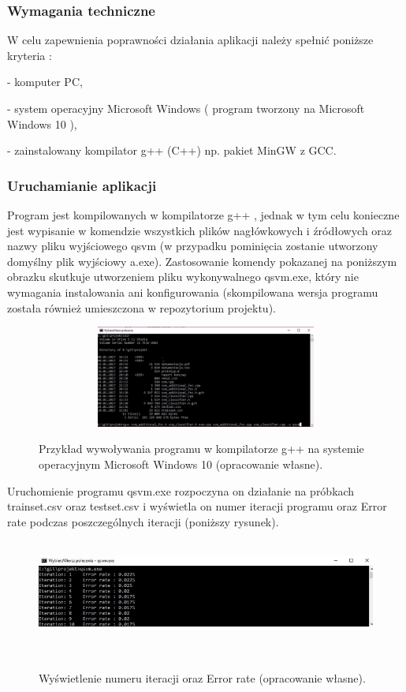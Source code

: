 \documentclass[[10pt,a4paper]{article}
\begin{document}
\begin{enumerate}
\subsubsection{Wymagania techniczne}  

\noindent W celu zapewnienia poprawności działania aplikacji należy spełnić poniższe kryteria :

\noindent - komputer PC, 

\noindent - system operacyjny Microsoft Windows ( program tworzony na Microsoft Windows 10 ),

\noindent - zainstalowany kompilator g++ (C++) np. pakiet MinGW z GCC.

\subsubsection{Uruchamianie aplikacji}

\noindent 
Program jest kompilowanych w kompilatorze g++ , jednak w tym celu konieczne jest wypisanie w komendzie wszystkich plików nagłówkowych i źródłowych oraz nazwy pliku wyjściowego qsvm (w przypadku pominięcia zostanie utworzony domyślny plik wyjściowy a.exe). Zastosowanie komendy pokazanej na poniższym obrazku skutkuje utworzeniem pliku wykonywalnego qsvm.exe, który nie wymagania instalowania ani konfigurowania (skompilowana wersja programu została również umieszczona w repozytorium projektu).

\begin{figure}[h]
\centering
\includegraphics[width=4.50in, height=1.32in]{kompilacja.jpg}\\
\caption{Przykład wywoływania programu w kompilatorze g++ na systemie operacyjnym Microsoft Windows 10 (opracowanie własne).}
\end{figure}

\noindent Uruchomienie programu qsvm.exe rozpoczyna on działanie na próbkach trainset.csv oraz testset.csv i wyświetla on numer iteracji programu oraz Error rate podczas poszczególnych iteracji (poniższy rysunek). 
\begin{figure}[h]
\centering
\includegraphics[width=4.50in, height=1.32in]{wywolanie.jpg}\
\caption{Wyświetlenie numeru iteracji oraz Error rate (opracowanie własne).}
\end{figure}




\end{enumerate}
\end{document}
